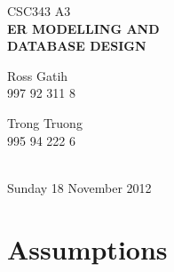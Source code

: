 \documentclass[12pt]{article}
\newcommand{\<}{\langle}
\renewcommand{\>}{\rangle}
\newcommand{\HRule}{\rule{\linewidth}{0.5mm}}
\begin{document}

	\begin{center}
	
	
	\textsc{\LARGE CSC343 A3}\\[1.0cm]
	
		
	{\huge \bfseries ER MODELLING AND \\ \vspace{6pt} DATABASE DESIGN}\\[1.0cm]
	
	
	\begin{minipage}{0.4\textwidth}
	\begin{flushright} \large
	Ross Gatih\\
	997 92 311 8
	\end{flushright}
	\end{minipage}\hspace{24pt}
	\begin{minipage}{0.4\textwidth}
	\begin{flushleft} \large
	Trong Truong\\
	995 94 222 6
	\end{flushleft}
	\end{minipage}\\[1cm]
	
	
	{\large Sunday 18 November 2012}
	
	\end{center}

\tableofcontents

\part{Assumptions}
\end{document}
